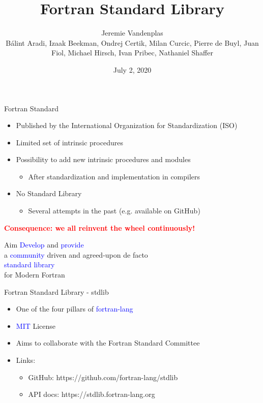 \documentclass{beamer}
\title{Fortran Standard Library}
\author[]{Jeremie Vandenplas\\[3mm]
Bálint Aradi,
Izaak Beekman,
Ondrej Certik,
Milan Curcic,
Pierre de Buyl,
Juan Fiol,
Michael Hirsch,
Ivan Pribec,
Nathaniel Shaffer}
\date{July 2, 2020}
\begin{document}
\begin{frame}[t]
	\titlepage
\end{frame}	

\begin{frame}[c]{Fortran Standard}
	\begin{itemize}
		\item Published by the International Organization for Standardization (ISO)
		\item Limited set of intrinsic procedures
		\item Possibility to add new intrinsic procedures and modules
		\begin{itemize}
			\item After standardization and implementation in compilers
		\end{itemize}
		\item No Standard Library
		\begin{itemize}
			\item Several attempts in the past (e.g. available on GitHub)
		\end{itemize}
	\end{itemize}
	\center
	\textcolor{red}{\textbf{Consequence: we all reinvent the wheel continuously!}}
\end{frame}


\begin{frame}[c]{Aim}
	\center
	\Large
	\textcolor{blue}{Develop} and \textcolor{blue}{provide}\\
	a \textcolor{blue}{community} driven and agreed-upon de facto\\
	\textcolor{blue}{standard library}\\
	for Modern Fortran
\end{frame}


\begin{frame}[c]{Fortran Standard Library - stdlib}
	\Large
	\begin{itemize}
		\item One of the four pillars of \textcolor{blue}{fortran-lang}
		\item \textcolor{blue}{MIT} License
		\item Aims to collaborate with the Fortran Standard Committee
		\item Links:
		\begin{itemize}
			\item GitHub: https://github.com/fortran-lang/stdlib
			\item API docs: https://stdlib.fortran-lang.org
		\end{itemize}
	\end{itemize}
\end{frame}
\end{document}
